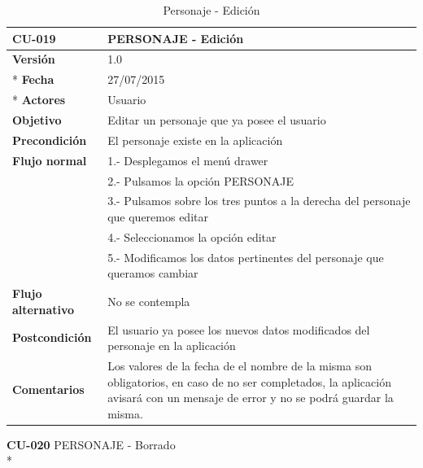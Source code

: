 \documentclass[../pfc.tex]{subfiles}
\begin{document}
		\begin{table}[H]
			\centering
			\begin{tabular}[t]{|p{3cm}|p{9.5cm}|}
				\hline \textbf{CU-019} & \textbf{PERSONAJE - Edición} \\*
				\hline\hline \textbf{Versión} & 1.0 \\ *
				\hline\hline \textbf{Fecha} & 27/07/2015 \\ *
				\hline\textbf{Actores} 	& Usuario\\*
				\hline \textbf{Objetivo} & Editar un personaje que ya posee el usuario\\* 			
				\hline \textbf{Precondición} & El personaje existe en la aplicación\\* 
				\hline \textbf{Flujo normal} & 1.- Desplegamos el menú drawer \\* 
				& 2.- Pulsamos la opción PERSONAJE\\*	
				& 3.- Pulsamos sobre los tres puntos a la derecha del personaje que queremos editar\\*	
				& 4.- Seleccionamos la opción editar\\*	
				& 5.- Modificamos los datos pertinentes del personaje que queramos cambiar\\*	
				\hline \textbf{Flujo alternativo} & No se contempla \\* 
				\hline \textbf{Postcondición} & El usuario ya posee los nuevos datos modificados del personaje en la aplicación \\* 
				\hline \textbf{Comentarios}   & Los valores de la fecha de el nombre de la misma son obligatorios, en caso de no ser completados, la aplicación avisará con un mensaje de error y no se podrá guardar la misma.\\*
				\hline
			\end{tabular}
			\caption{Personaje - Edición}
			\label{tabla:caso019}
		\end{table}
		
		\textbf{CU-020}	PERSONAJE - Borrado\\*
		
\end{document}

